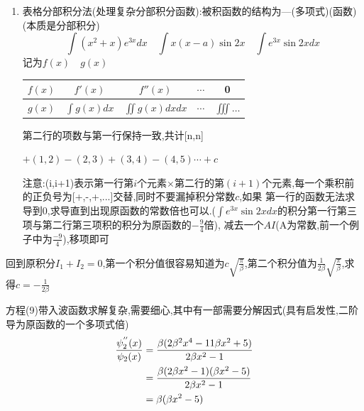\begin{formal}
\begin{enumerate}
\begin{proof}
                \end{proof}

            \item 表格分部积分法(处理复杂分部积分函数):被积函数的结构为---(多项式)(函数)\quad(本质是分部积分)
                $$ \int(x^{2}+x) e^{3x} dx \quad \int x(x-a)\sin{2x} \quad \int e^{3x}\sin{2x}dx $$
                记为$f(x) \quad g(x)$

              
                \begin{center}

                    \begin{tabular}{|c|c|c|c|c|}
                        
                        \hline
                        $f(x)$ & $f'(x)$        & $f''(x)$          & $\cdots$ & 0 \\
                        \hline
                        $g(x)$ & $\int g(x) dx$ & $\iint g(x) dxdx$ & $\cdots$ & $\iiint \dots$ \\
                        \hline
                        
                    \end{tabular}
                    
                \end{center}
                
                第二行的项数与第一行保持一致,共计[n,n]

                $+(1,2)-(2,3)+(3,4)-(4,5)\cdots + c$ \quad 
                
                注意:(i,i+1)表示第一行第$i$个元素$\times$第二行的第$(i+1)$个元素,每一个乘积前的正负号为[+,-,+,...]交替,同时不要漏掉积分常数$c$,如果
                第一行的函数无法求导到0,求导直到出现原函数的常数倍也可以.($\int e^{3x}\sin{2x}dx $的积分第一行第三项与第二行第三项积的积分为原函数的$-\frac{9}{4}$倍),
                减去一个$A I$(A为常数,前一个例子中为$\frac{-9}{4}$),移项即可
            \end{enumerate}   
        \end{formal}

        回到原积分$I_{1}+I_{2}=0$,第一个积分值很容易知道为$c \sqrt{\frac{\pi}{\beta}}$,第二个积分值为$\frac{1}{2\beta} \sqrt{\frac{\pi}{\beta}}$,求得$ c = -\frac{1}{2\beta}$

        方程(9)带入波函数求解复杂,需要细心,其中有一部需要分解因式(具有启发性,二阶导为原函数的一个多项式倍)
        \begin{align*}
            \frac{\psi_{2}^{''} (x)}{\psi_{2} (x)} & = \frac{\beta (2\beta^{2} x^{4} -11\beta x^{2} +5)}{2\beta x^{2}-1} \\
                                        & = \frac{\beta (2\beta x^{2} - 1) (\beta x^{2}-5)}{2\beta x^{2}-1}   \\
                                        & = \beta(\beta x^{2}-5) 
        \end{align*}
        
